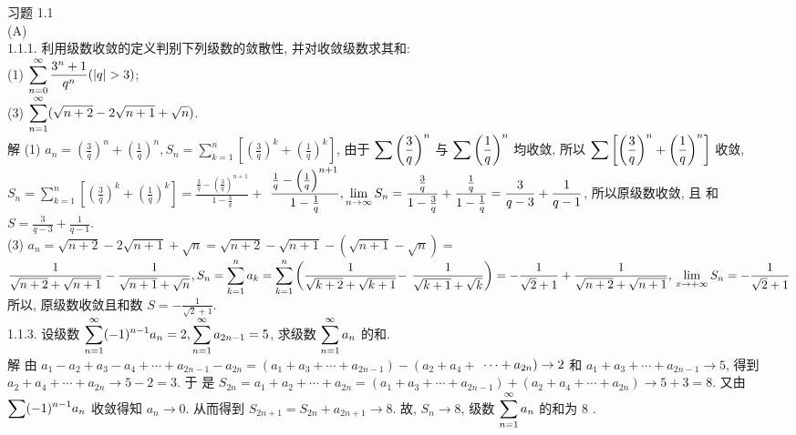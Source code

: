 \documentclass[a4paper,11pt,UTF8]{article}
\title{}
\author{}
\begin{document}
习题 1.1\\
(A)\\
1.1.1. 利用级数收敛的定义判别下列级数的敛散性, 并对收敛级数求其和:\\
(1) $\displaystyle \displaystyle \displaystyle \sum_{n=0}^{\infty} \frac{3^n+1}{q^n}(|q|>3)$;\\
(3) $\displaystyle \displaystyle \displaystyle \sum_{n=1}^{\infty}(\sqrt{n+2}-2 \sqrt{n+1}+\sqrt{n})$.\\
解 (1) $a_n=\left(\frac{3}{q}\right)^n+\left(\frac{1}{q}\right)^n, S_n=\sum_{k=1}^n\left[\left(\frac{3}{q}\right)^k+\left(\frac{1}{q}\right)^k\right]$, 由于 $\displaystyle \displaystyle \displaystyle \sum\left(\frac{3}{q}\right)^n$ 与 $\displaystyle \displaystyle \displaystyle \sum\left(\frac{1}{q}\right)^n$ 均收敛, 所以 $\displaystyle \displaystyle \displaystyle \sum\left[\left(\frac{3}{q}\right)^n+\left(\frac{1}{q}\right)^n\right]$ 收敛,\\$S_n=\sum_{k=1}^n\left[\left(\frac{3}{q}\right)^k+\left(\frac{1}{q}\right)^k\right]=\frac{\frac{3}{q}-\left(\frac{3}{q}\right)^{n+1}}{1-\frac{3}{q}}+$ $\displaystyle \displaystyle \displaystyle \frac{\frac{1}{q}-\left(\frac{1}{q}\right)^{n+1}}{1-\frac{1}{q}}, \lim _{n \rightarrow \infty} S_n=\frac{\frac{3}{q}}{1-\frac{3}{q}}+\frac{\frac{1}{q}}{1-\frac{1}{q}}=\frac{3}{q-3}+\frac{1}{q-1}$, 所以原级数收敛, 且 和 $S=\frac{3}{q-3}+\frac{1}{q-1}$.\\
(3) $a_n=\sqrt{n+2}-2 \sqrt{n+1}+\sqrt{n}=\sqrt{n+2}-\sqrt{n+1}-(\sqrt{n+1}-\sqrt{n})=$
 $\displaystyle \displaystyle \displaystyle \frac{1}{\sqrt{n+2}+\sqrt{n+1}}-\frac{1}{\sqrt{n+1}+\sqrt{n}}, \\
  S_n=\sum_{k=1}^n a_k=\sum_{k=1}^n\left(\frac{1}{\sqrt{k+2}+\sqrt{k+1}}-\right.\left.\frac{1}{\sqrt{k+1}+\sqrt{k}}\right)=-\frac{1}{\sqrt{2}+1}+\frac{1}{\sqrt{n+2}+\sqrt{n+1}}, \\
\lim _{x \rightarrow+\infty} S_n=-\frac{1}{\sqrt{2}+1}$\\
   所以, 原级数收敛且和数 $S=-\frac{1}{\sqrt{2}+1}$.\\
1.1.3. 设级数 $\displaystyle \displaystyle \displaystyle \sum_{n=1}^{\infty}(-1)^{n-1} a_n=2, \sum_{n=1}^{\infty} a_{2 n-1}=5$, 求级数 $\displaystyle \displaystyle \displaystyle \sum_{n=1}^{\infty} a_n$ 的和.\\
解 由 $a_1-a_2+a_3-a_4+\cdots+a_{2 n-1}-a_{2 n}=\left(a_1+a_3+\cdots+a_{2 n-1}\right)-\left(a_2+a_4+\right.$ $\displaystyle \displaystyle \displaystyle \left.\cdots+a_{2 n}\right) \rightarrow 2$ 和 $a_1+a_3+\cdots+a_{2 n-1} \rightarrow 5$, 得到 $a_2+a_4+\cdots+a_{2 n} \rightarrow 5-2=3$. 于 是 $S_{2 n}=a_1+a_2+\cdots+a_{2 n}=\left(a_1+a_3+\cdots+a_{2 n-1}\right)+\left(a_2+a_4+\cdots+a_{2 n}\right) \rightarrow 5+3=8$. 又由 $\displaystyle \displaystyle \displaystyle \sum(-1)^{n-1} a_n$ 收敛得知 $a_n \rightarrow 0$. 从而得到 $S_{2 n+1}=S_{2 n}+a_{2 n+1} \rightarrow 8$. 故, $S_n \rightarrow 8$, 级数 $\displaystyle \displaystyle \displaystyle \sum_{n=1}^{\infty} a_n$ 的和为 8 .\\
\end{document}
